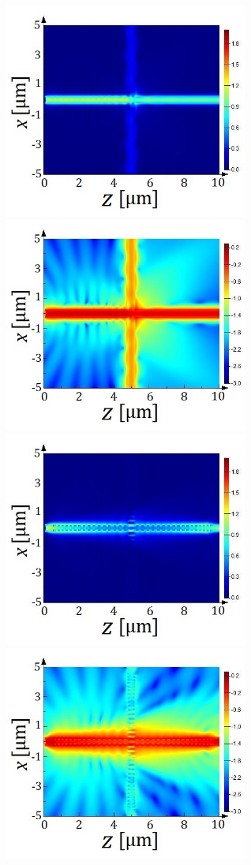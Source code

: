 \documentclass[aps,prl,twocolumn, superscriptaddress]{revtex4}
\begin{document}
\begin{figure}[htbp]
    \centering
    \includegraphics[width=8cm]{Regular_crossing.jpg}
    \includegraphics[width=8cm]{Regular_crossing_log.jpg}
    \includegraphics[width=8cm]{swg_bock_1.jpg}
    \includegraphics[width=8cm]{swg_bock_1_log.jpg}

\end{figure}
\end{document}
